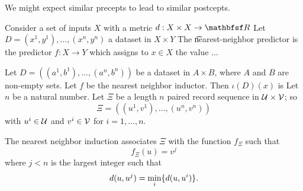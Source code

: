 
We might expect similar precepts to lead to similar postcepts.

Consider a set of inputs $X$ with a metric $d: X \times X \to \R$
Let $D = (x^1, y^1), \dots , (x^n, y^n)$ a dataset in $X \times  Y$
The \t{nearest-neighbor predictor} is the predictor $f: X \to Y$ which assigns to $x \in X$ the value ...

Let $D = ((a^1, b^1), \dots , (a^n, b^n))$ be a dataset in $A \times  B$, where $A$ and $B$ are non-empty sets.
Let $f$ be the nearest neighbor inductor.
Then $\iota (D)(x)$ is
Let $n$ be a natural number.
Let $\Xi$ be a length $n$ paired record sequence in $\mathcal{U} \times  \mathcal{V}$; so
  \[
\Xi = ((u^1, v^1), \dots , (u^n, v^n))
  \]
with $u^i \in \mathcal{U}$ and $v^i \in \mathcal{V}$ for $i = 1,\dots ,n$.

The nearest neighbor induction associates
$\Xi $ with the function $f_{\Xi }$ such that
  \[
f_{\Xi }(u) = v^j
  \]
where $j < n$ is the largest integer such that
  \[
d(u, u^j) = \min_{i} \{d(u, u^i)\}.
  \]

\blankpage
